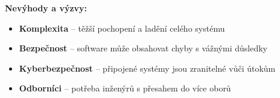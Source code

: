 \documentclass[a4paper,10pt]{article}
\begin{document}
\begin{vysvetlenibox}
\textbf{Nevýhody a výzvy:}
\begin{itemize}[noitemsep, leftmargin=1.4em, topsep=4pt]
    \item \textbf{Komplexita} -- těžší pochopení a ladění celého systému
    \item \textbf{Bezpečnost} -- software může obsahovat chyby s vážnými důsledky
    \item \textbf{Kyberbezpečnost} -- připojené systémy jsou zranitelné vůči útokům
    \item \textbf{Odborníci} -- potřeba inženýrů s přesahem do více oborů
\end{itemize}
\end{vysvetlenibox}


\end{document}
